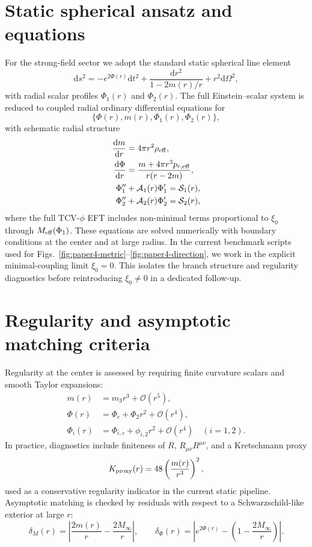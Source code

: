 \documentclass[aps,prd,onecolumn,nofootinbib,superscriptaddress]{revtex4-2}
\newcommand{\Meff}{M_{\rm eff}}
\newcommand{\dd}{\mathrm{d}}
\begin{document}
\section{Static spherical ansatz and equations}
For the strong-field sector we adopt the standard static spherical line element
\begin{equation}
\dd s^2=-e^{2\Phi(r)}\dd t^2+\frac{\dd r^2}{1-2m(r)/r}+r^2\dd\Omega^2,
\label{eq:metric-ansatz}
\end{equation}
with radial scalar profiles $\Phi_1(r)$ and $\Phi_2(r)$.
The full Einstein--scalar system is reduced to coupled radial ordinary differential equations for
\begin{equation}
\{\Phi(r),m(r),\Phi_1(r),\Phi_2(r)\},
\end{equation}
with schematic radial structure
\begin{align}
\frac{\dd m}{\dd r} &= 4\pi r^2 \rho_{\rm eff},\\
\frac{\dd \Phi}{\dd r} &= \frac{m+4\pi r^3 p_{r,{\rm eff}}}{r(r-2m)},\\
\Phi_1'' &+ \mathcal{A}_1(r)\Phi_1' = \mathcal{S}_1(r),\\
\Phi_2'' &+ \mathcal{A}_2(r)\Phi_2' = \mathcal{S}_2(r),
\end{align}
where the full TCV-$\phi$ EFT includes non-minimal terms proportional to $\xi_0$ through $\Meff(\Phi_1)$.
These equations are solved numerically with boundary conditions at the center and at large radius.
In the current benchmark scripts used for Figs.~\ref{fig:paper4-metric}--\ref{fig:paper4-direction}, we work in the explicit minimal-coupling limit $\xi_0=0$.
This isolates the branch structure and regularity diagnostics before reintroducing $\xi_0\neq0$ in a dedicated follow-up.

\section{Regularity and asymptotic matching criteria}
Regularity at the center is assessed by requiring finite curvature scalars and smooth Taylor expansions:
\begin{align}
m(r)&=m_3r^3+\mathcal{O}(r^5),\\
\Phi(r)&=\Phi_c+\Phi_2r^2+\mathcal{O}(r^4),\\
\Phi_i(r)&=\Phi_{i,c}+\phi_{i,2}r^2+\mathcal{O}(r^4)\quad (i=1,2).
\end{align}
In practice, diagnostics include finiteness of $R$, $R_{\mu\nu}R^{\mu\nu}$, and a Kretschmann proxy
\begin{equation}
K_{\rm proxy}(r)=48\left(\frac{m(r)}{r^3}\right)^2,
\end{equation}
used as a conservative regularity indicator in the current static pipeline.
Asymptotic matching is checked by residuals with respect to a Schwarzschild-like exterior at large $r$:
\begin{equation}
\delta_M(r)=\left|\frac{2m(r)}{r}-\frac{2M_{\infty}}{r}\right|,
\qquad
\delta_\Phi(r)=\left|e^{2\Phi(r)}-\left(1-\frac{2M_{\infty}}{r}\right)\right|.
\end{equation}
\end{document}
